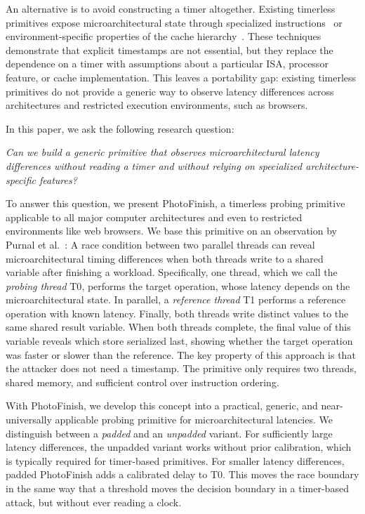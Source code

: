 \documentclass[letterpaper,twocolumn,10pt]{article} %
\newcommand{\AttackName}{PhotoFinish\xspace}
\newcommand{\tprobe}{{\fontfamily{cmtt}\selectfont T0}\xspace}
\newcommand{\tref}{{\fontfamily{cmtt}\selectfont T1}\xspace}
\begin{document}
An alternative is to avoid constructing a timer altogether.
Existing timerless primitives expose microarchitectural state through specialized instructions~\cite{Disselkoen2017prime,kim2022dprime,Yu2023Synchronization,Zhang2023MWAIT,Thomas2025Exfilstate,Hornetz2026tdxray} or environment-specific properties of the cache hierarchy~\cite{Guanciale2016Cache,Jin2025Ghostcache,Thomas2025Exfilstate,thomas2026riscy}.
These techniques demonstrate that explicit timestamps are not essential, but they replace the dependence on a timer with assumptions about a particular ISA, processor feature, or cache implementation.
This leaves a portability gap: existing timerless primitives do not provide a generic way to observe latency differences across architectures and restricted execution environments, such as browsers.

In this paper, we ask the following research question:

\emph{Can we build a generic primitive that observes microarchitectural latency differences without reading a timer and without relying on specialized architecture-specific features?}

To answer this question, we present \AttackName, a timerless probing primitive applicable to all major computer architectures and even to restricted environments like web browsers.
We base this primitive on an observation by Purnal et al.~\cite{Purnal2023showtime}: A race condition between two parallel threads can reveal microarchitectural timing differences when both threads write to a shared variable after finishing a workload.
Specifically, one thread, which we call the \emph{probing thread} \tprobe, performs the target operation, whose latency depends on the microarchitectural state.
In parallel, a \emph{reference thread} \tref performs a reference operation with known latency.
Finally, both threads write distinct values to the same shared result variable.
When both threads complete, the final value of this variable reveals which store serialized last, showing whether the target operation was faster or slower than the reference.
The key property of this approach is that the attacker does not need a timestamp.
The primitive only requires two threads, shared memory, and sufficient control over instruction ordering.

With \AttackName, we develop this concept into a practical, generic, and near-universally applicable probing primitive for microarchitectural latencies.
We distinguish between a \emph{padded} and an \emph{unpadded} variant.
For sufficiently large latency differences, the unpadded variant works without prior calibration, which is typically required for timer-based primitives.
For smaller latency differences, padded \AttackName adds a calibrated delay to \tprobe.
This moves the race boundary in the same way that a threshold moves the decision boundary in a timer-based attack, but without ever reading a clock.
\end{document}
